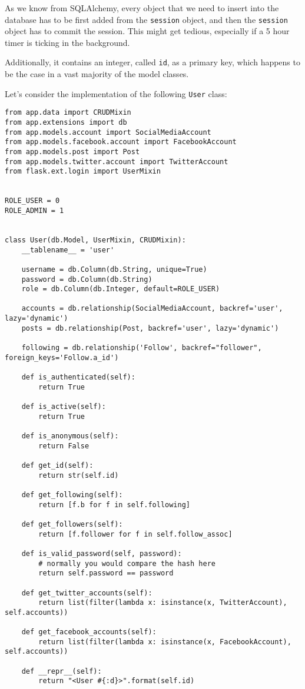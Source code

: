 \documentclass[../main/main.tex]{subfiles}
\begin{document}
As we know from SQLAlchemy, every object that we need to insert into the
database has to be first added from the \lstinline|session| object, and
then the \lstinline|session| object has to commit the session. This
might get tedious, especially if a 5 hour timer is ticking in the
background.

Additionally, it contains an integer, called \lstinline|id|, as a
primary key, which happens to be the case in a vast majority of the
model classes.

Let's consider the implementation of the following \lstinline|User|
class: 

\begin{lstlisting}[caption=app/models/user.py, label=lst:user.py]
from app.data import CRUDMixin
from app.extensions import db
from app.models.account import SocialMediaAccount
from app.models.facebook.account import FacebookAccount
from app.models.post import Post
from app.models.twitter.account import TwitterAccount
from flask.ext.login import UserMixin


ROLE_USER = 0
ROLE_ADMIN = 1


class User(db.Model, UserMixin, CRUDMixin):
    __tablename__ = 'user'

    username = db.Column(db.String, unique=True)
    password = db.Column(db.String)
    role = db.Column(db.Integer, default=ROLE_USER)

    accounts = db.relationship(SocialMediaAccount, backref='user', lazy='dynamic')
    posts = db.relationship(Post, backref='user', lazy='dynamic')

    following = db.relationship('Follow', backref="follower", foreign_keys='Follow.a_id')

    def is_authenticated(self):
        return True

    def is_active(self):
        return True

    def is_anonymous(self):
        return False

    def get_id(self):
        return str(self.id)

    def get_following(self):
        return [f.b for f in self.following]

    def get_followers(self):
        return [f.follower for f in self.follow_assoc]

    def is_valid_password(self, password):
        # normally you would compare the hash here
        return self.password == password

    def get_twitter_accounts(self):
        return list(filter(lambda x: isinstance(x, TwitterAccount), self.accounts))

    def get_facebook_accounts(self):
        return list(filter(lambda x: isinstance(x, FacebookAccount), self.accounts))

    def __repr__(self):
        return "<User #{:d}>".format(self.id)
\end{lstlisting}
\end{document}
